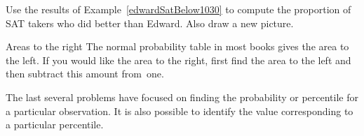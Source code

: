 \begin{exercisewrap}
\begin{nexercise}
Use the results of Example~\ref{edwardSatBelow1030} to compute the proportion of SAT takers who did better than Edward. Also draw a new picture.\footnotemark
\end{nexercise}
\end{exercisewrap}


\begin{onebox}{Areas to the right}
The normal probability table in most books gives the area to the left. If you would like the area to the right, first find the area to the left and then subtract this amount from~one.\end{onebox}

The last several problems have focused on finding the probability or percentile for a particular observation. It is also possible to identify the value corresponding to a particular percentile.

\D{\newpage}

